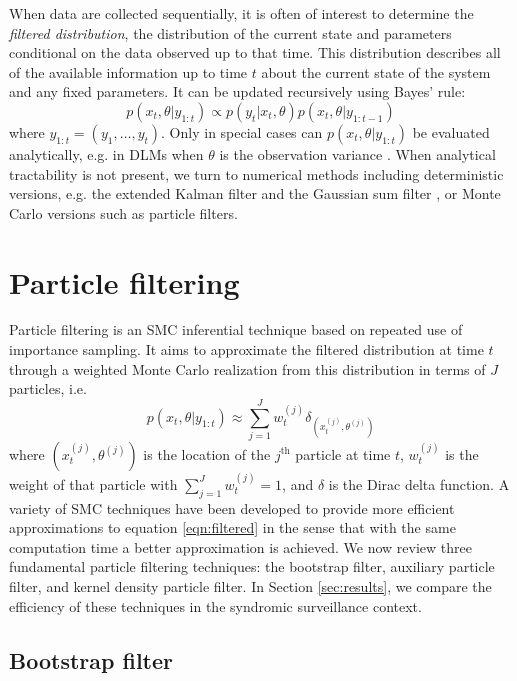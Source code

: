 \documentclass{elsarticle}
\begin{document}
When data are collected sequentially, it is often of interest to determine the \emph{filtered distribution}, the distribution of the current state and parameters conditional on the data observed up to that time. This distribution describes all of the available information up to time $t$ about the current state of the system and any fixed parameters. It can be updated recursively using Bayes' rule:
\begin{equation}
p(x_t,\theta| y_{1:t}) \propto p(y_t|x_t,\theta)p(x_t,\theta|y_{1:t-1}) \label{eqn:filtered}
\end{equation}
where $y_{1:t} = (y_1,\ldots,y_t)$. Only in special cases can $p(x_t,\theta| y_{1:t})$ be evaluated analytically, e.g. in DLMs when $\theta$ is the observation variance \cite[Sec 4.3,][]{petris2009dynamic}. When analytical tractability is not present, we turn to numerical methods including deterministic versions, e.g. the extended Kalman filter and the Gaussian sum filter \citep{Alsp:Sore:nonl:1972}, or Monte Carlo versions such as particle filters.

\section{Particle filtering \label{sec:filtering}}

Particle filtering is an SMC inferential technique based on repeated use of importance sampling. It aims to approximate the filtered distribution at time $t$ through a weighted Monte Carlo realization from this distribution in terms of $J$ particles, i.e.
\begin{equation}
p(x_t,\theta| y_{1:t}) \approx \sum_{j=1}^J w_t^{(j)} \delta_{\left(x_t^{(j)},\theta^{(j)}\right)} \label{eqn:approx}
\end{equation}
where $\left(x_t^{(j)},\theta^{(j)}\right)$ is the location of the $j^{\mbox{th}}$ particle at time $t$, $w_t^{(j)}$ is the weight of that particle with $\sum_{j=1}^J w_t^{(j)}=1$, and $\delta$ is the Dirac delta function. A variety of SMC techniques have been developed to provide more efficient approximations to equation \eqref{eqn:filtered} in the sense that with the same computation time a better approximation is achieved. We now review three fundamental particle filtering techniques: the bootstrap filter, auxiliary particle filter, and kernel density particle filter. In Section \ref{sec:results}, we compare the efficiency of these techniques in the syndromic surveillance context.

\subsection{Bootstrap filter \label{sec:bf}}
\end{document}
